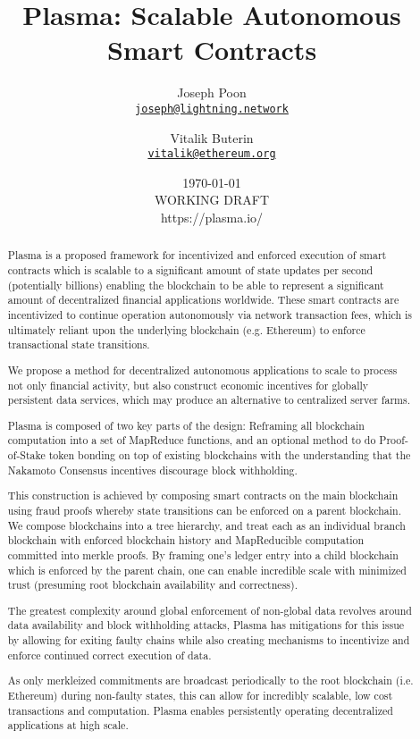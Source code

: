 \documentclass[letterpaper, 11pt]{article}
\title{\LARGE Plasma: Scalable Autonomous Smart Contracts}
\author{
                Joseph Poon\\
                \footnotesize\href{mailto:joseph@lightning.network}
                        {\nolinkurl{joseph@lightning.network}}
			\and
                Vitalik Buterin\\
                \footnotesize\href{mailto:vitalik@ethereum.org}
                        {\nolinkurl{vitalik@ethereum.org}}
        }
\date{\today\\\small WORKING DRAFT\\\small https://plasma.io/}
\begin{document}
\maketitle


\begin{abstract}
	Plasma is a proposed framework for incentivized and enforced execution
	of smart contracts which is scalable to a significant amount of state
	updates per second (potentially billions) enabling the blockchain to be
	able to represent a significant amount of decentralized financial
	applications worldwide. These smart contracts are incentivized to
	continue operation autonomously via network transaction fees, which is
	ultimately reliant upon the underlying blockchain (e.g. Ethereum) to
	enforce transactional state transitions.

	We propose a method for decentralized autonomous applications to scale
	to process not only financial activity, but also construct economic
	incentives for globally persistent data services, which may produce 
	an alternative to centralized server farms.

	Plasma is composed of two key parts of the design: Reframing all
	blockchain computation into a set of MapReduce functions, and an
	optional method to do Proof-of-Stake token bonding on top of existing
	blockchains with the understanding that the Nakamoto Consensus
	incentives discourage block withholding.

	This construction is achieved by composing smart contracts on the main
	blockchain using fraud proofs whereby state transitions can be enforced
	on a parent blockchain. We compose blockchains into a tree hierarchy,
	and treat each as an individual branch blockchain with enforced
	blockchain history and MapReducible computation committed into merkle
	proofs. By framing one's ledger entry into a child blockchain which is
	enforced by the parent chain, one can enable incredible scale with
	minimized trust (presuming root blockchain availability and
	correctness).

	The greatest complexity around global enforcement of non-global data
	revolves around data availability and block withholding attacks, Plasma
	has mitigations for this issue by allowing for exiting faulty chains
	while also creating mechanisms to incentivize and enforce continued
	correct execution of data.

	As only merkleized commitments are broadcast periodically to the root
	blockchain (i.e. Ethereum) during non-faulty states, this can allow for
	incredibly scalable, low cost transactions and computation. Plasma
	enables persistently operating decentralized applications at high
	scale.
\end{abstract}
\end{document}
